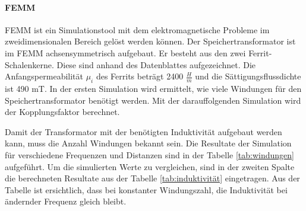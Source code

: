 \paragraph{FEMM}
FEMM ist ein Simulationstool mit dem elektromagnetische Probleme im zweidimensionalen Bereich gelöst werden können. Der Speichertransformator ist im FEMM achsensymmetrisch aufgebaut. Er besteht aus den zwei Ferrit-Schalenkerne. Diese sind anhand des Datenblattes aufgezeichnet. Die Anfangspermeabilität $ \mu_{i} $ des Ferrits beträgt 2400 $ \frac{H}{m} $ und die Sättigungsflussdichte ist 490 mT. In der ersten Simulation wird ermittelt, wie viele Windungen für den Speichertransformator benötigt werden. Mit der darauffolgenden Simulation wird der Kopplungsfaktor berechnet. 

Damit der Transformator mit der benötigten Induktivität aufgebaut werden kann, muss die Anzahl Windungen bekannt sein. Die Resultate der Simulation für verschiedene Frequenzen und Distanzen sind in der Tabelle \ref{tab:windungen} aufgeführt. Um die simulierten Werte zu vergleichen, sind in der zweiten Spalte die berechneten Resultate aus der Tabelle \ref{tab:induktivität} eingetragen. Aus der Tabelle ist ersichtlich, dass bei konstanter Windungszahl, die Induktivität bei ändernder Frequenz gleich bleibt.

